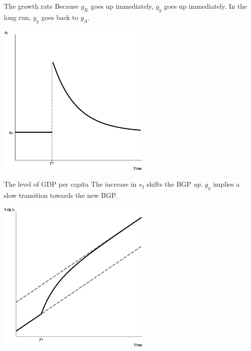 \begin{frame}{The growth rate}
Because $g_K$ goes up immediately, $g_y$ goes up immediately. In the long run, $g_y$ goes back to $g_A$.
\begin{center}
\includegraphics[height=3in]{../Figures/fig-ch2-fig4.eps}
\end{center}
\end{frame}

\begin{frame}{The level of GDP per capita}
The increase in $s_I$ shifts the BGP \textit{up}. $g_y$ implies a slow transition towards the new BGP.
\begin{center}
\includegraphics[height=3in]{../Figures/fig-ch2-fig5.eps}
\end{center}
\end{frame}

